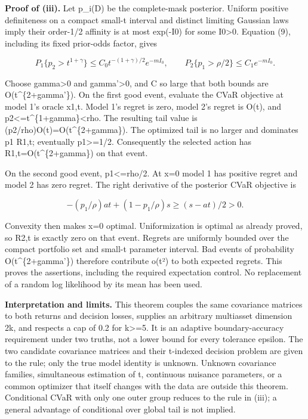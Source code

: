 \documentclass[10pt]{article}
\begin{document}
\textbf{Proof of (iii).} Let p\_i(D) be the complete-mask posterior. Uniform positive definiteness on a compact small-t interval and distinct limiting Gaussian laws imply their order-1/2 affinity is at most exp(-I0) for some I0>0. Equation (9), including its fixed prior-odds factor, gives

\[
P_1\{p_2>t^{1+\gamma}\}\le C_0 t^{-(1+\gamma)/2}e^{-m I_0},\qquad
P_2\{p_1>\rho/2\}\le C_1 e^{-m I_0}.
\]



Choose gamma>0 and gamma'>0, and C so large that both bounds are O(t\textasciicircum{}\{2+gamma'\}). On the first good event, evaluate the CVaR objective at model 1's oracle x1,t. Model 1's regret is zero, model 2's regret is O(t), and p2<=t\textasciicircum{}\{1+gamma\}<rho. The resulting tail value is (p2/rho)O(t)=O(t\textasciicircum{}\{2+gamma\}). The optimized tail is no larger and dominates p1 R1,t; eventually p1>=1/2. Consequently the selected action has R1,t=O(t\textasciicircum{}\{2+gamma\}) on that event.

On the second good event, p1<=rho/2. At x=0 model 1 has positive regret and model 2 has zero regret. The right derivative of the posterior CVaR objective is

\[
-(p_1/\rho)at+(1-p_1/\rho)s\ge (s-at)/2>0.
\]



Convexity then makes x=0 optimal. Uniformization is optimal as already proved, so R2,t is exactly zero on that event. Regrets are uniformly bounded over the compact portfolio set and small-t parameter interval. Bad events of probability O(t\textasciicircum{}\{2+gamma'\}) therefore contribute o(t²) to both expected regrets. This proves the assertions, including the required expectation control. No replacement of a random log likelihood by its mean has been used.

\textbf{Interpretation and limits.} This theorem couples the same covariance matrices to both returns and decision losses, supplies an arbitrary multiasset dimension 2k, and respects a cap of 0.2 for k>=5. It is an adaptive boundary-accuracy requirement under two truths, not a lower bound for every tolerance epsilon. The two candidate covariance matrices and their t-indexed decision problem are given to the rule; only the true model identity is unknown. Unknown covariance families, simultaneous estimation of t, continuous nuisance parameters, or a common optimizer that itself changes with the data are outside this theorem. Conditional CVaR with only one outer group reduces to the rule in (iii); a general advantage of conditional over global tail is not implied.
\end{document}
